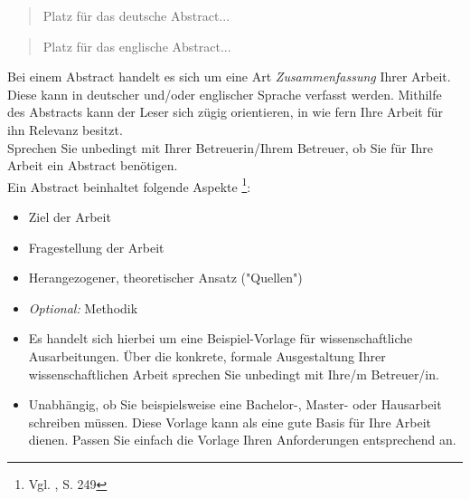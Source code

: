 \documentclass[a4paper,12pt,oneside]{article}
\begin{document}
  \newpage
  
  \begin{abstract}
    Platz für das deutsche Abstract...
  \end{abstract}
  
  \renewcommand{\abstractname}{Abstract}
  \begin{abstract}
    Platz für das englische Abstract...
  \end{abstract}
    \vspace{1cm}
  \begin{tcolorbox}[title={Das Abstract}]
Bei einem Abstract handelt es sich um eine Art \textit{Zusammenfassung} Ihrer Arbeit. Diese kann in deutscher und/oder englischer Sprache verfasst werden. Mithilfe des Abstracts kann der Leser sich zügig orientieren, in wie fern Ihre Arbeit für ihn Relevanz besitzt.\\                                                                      Sprechen Sie unbedingt mit Ihrer Betreuerin/Ihrem Betreuer, ob Sie für Ihre Arbeit ein Abstract benötigen.\\
Ein Abstract beinhaltet folgende Aspekte \footnote{ Vgl. \cite{SW11}, S. 249}:
\begin{itemize}
 \item Ziel der Arbeit
 \item Fragestellung der Arbeit
  \item Herangezogener, theoretischer Ansatz ("Quellen")
  \item \textit{Optional:} Methodik
\end{itemize}
  \end{tcolorbox}

  \vspace{1cm}
  \begin{tcolorbox}[title={Hinweise zu dieser Dokumentvorlage}]
  \begin{itemize}
   \item Es handelt sich hierbei um eine Beispiel-Vorlage für wissenschaftliche Ausarbeitungen.
Über die konkrete, formale Ausgestaltung Ihrer wissenschaftlichen Arbeit sprechen Sie unbedingt mit Ihre/m Betreuer/in.
  \item Unabhängig, ob Sie beispielsweise eine Bachelor-, Master- oder Hausarbeit schreiben müssen. Diese Vorlage kann als eine gute Basis für Ihre Arbeit dienen. Passen Sie einfach die Vorlage Ihren Anforderungen entsprechend an.
  \end{itemize}
  \end{tcolorbox}
  
\end{document}
